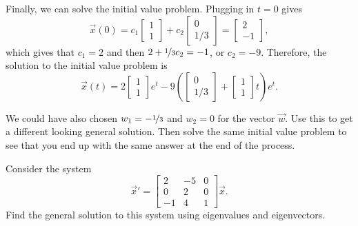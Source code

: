 \begin{exampleSol}
Finally, we can solve the initial value problem. Plugging in $t=0$ gives
\begin{equation*}
\vec{x}(0) = c_1 \begin{bmatrix} 1 \\ 1 \end{bmatrix} + c_2 \begin{bmatrix} 0 \\ 1/3 \end{bmatrix} = \begin{bmatrix} 2 \\ -1 \end{bmatrix},
\end{equation*}
which gives that $c_1 = 2$ and then $2 + \nicefrac{1}{3}c_2 = -1$, or $c_2 = -9$. Therefore, the solution to the initial value problem is
\begin{equation*}
\vec{x}(t) = 2 \begin{bmatrix} 1 \\ 1 \end{bmatrix} e^t - 9 \left(\begin{bmatrix} 0 \\ 1/3 \end{bmatrix} + \begin{bmatrix} 1 \\ 1 \end{bmatrix} t \right) e^{t}.
\end{equation*}
\end{exampleSol}

\begin{exercise}
We could have also chosen $w_1 = -\nicefrac{1}{3}$ and $w_2 = 0$ for the vector $\vec{w}$. Use this to get a different looking general solution. Then solve the same initial value problem to see that you end up with the same answer at the end of the process. 
\end{exercise}

\begin{example}
Consider the system
\begin{equation*}
\vec{x}' =
\begin{bmatrix}
2 & -5 & 0 \\
0 & 2 & 0 \\
-1 & 4 & 1
\end{bmatrix}
\vec{x} .
\end{equation*}
Find the general solution to this system using eigenvalues and eigenvectors.
\end{example}

